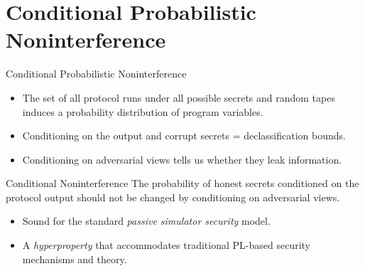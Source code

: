 \documentclass{beamer}
\begin{document}
\section{Conditional Probabilistic Noninterference}
\begin{frame}{Conditional Probabilistic Noninterference}

  \begin{itemize}
    \item The set of all protocol runs under all possible secrets and random tapes
      induces a probability distribution of program variables.
    \item Conditioning on the output and corrupt secrets =  declassification
      bounds.
    \item Conditioning on adversarial views tells us whether they leak information.
  \end{itemize}
  
  \begin{alertblock}{Conditional Noninterference}
    The probability of honest secrets conditioned on the protocol output
    should not be changed by conditioning on adversarial views. 
  \end{alertblock}

  \begin{itemize}
  \item Sound for the standard \emph{passive simulator security} model.
  \item A \emph{hyperproperty} that accommodates traditional PL-based security
    mechanisms and theory. 
  \end{itemize}
  
\end{frame}
\end{document}
